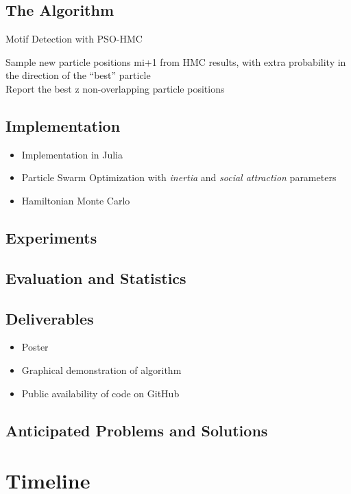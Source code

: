\documentclass{article}
\begin{document}
\subsection{The Algorithm}
\begin{algorithm}
\caption{Motif Detection with PSO-HMC}
\begin{algorithmic}
		\EndFor
	\EndWhile
\EndFor
\end{algorithmic}
\end{algorithm}
Sample new particle positions mi+1 from HMC results, with extra probability in the direction of the “best” particle \\
	Report the best z non-overlapping particle positions
\subsection{Implementation}
\begin{itemize}
	\item Implementation in Julia
	\item Particle Swarm Optimization with \textit{inertia} and \textit{social attraction} parameters
	\item Hamiltonian Monte Carlo 
\end{itemize}
\subsection{Experiments}
\subsection{Evaluation and Statistics}
\subsection{Deliverables}
\begin{itemize}
	\item Poster
	\item Graphical demonstration of algorithm
	\item Public availability of code on GitHub
\end{itemize}
\subsection{Anticipated Problems and Solutions}
\section{Timeline}
\printbibliography
\end{document}
